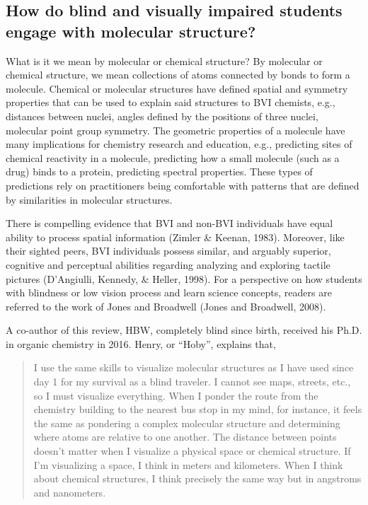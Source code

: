 \documentclass[11.5pt]{sig-alternate} %
\begin{document}
\begin{large}
\subsection*{How do blind and visually impaired students engage with molecular structure?}

What is it we mean by molecular or chemical structure? By molecular or chemical structure, we mean collections of atoms connected by bonds to form a molecule. Chemical or molecular structures have defined spatial and symmetry properties that can be used to explain said structures to BVI chemists, e.g., distances between nuclei, angles defined by the positions of three nuclei, molecular point group symmetry. The geometric properties of a molecule have many implications for chemistry research and education, e.g., predicting sites of chemical reactivity in a molecule, predicting how a small molecule (such as a drug) binds to a protein, predicting spectral properties. These types of predictions rely on practitioners being comfortable with patterns that are defined by similarities in molecular structures.

There is compelling evidence that BVI and non-BVI individuals have equal ability to process spatial information (Zimler \& Keenan, 1983). Moreover, like their sighted peers, BVI individuals possess similar, and arguably superior, cognitive and perceptual abilities regarding analyzing and exploring tactile pictures (D’Angiulli, Kennedy, \& Heller, 1998). For a perspective on how students with blindness or low vision process and learn science concepts, readers are referred to the work of Jones and Broadwell (Jones and Broadwell, 2008).

A co-author of this review, HBW, completely blind since birth, received his Ph.D. in organic chemistry in 2016. Henry, or “Hoby”, explains that,

\begin{quote}
    I use the same skills to visualize molecular structures as I have used since day 1 for my survival as a blind traveler. I cannot see maps, streets, etc., so I must visualize everything. When I ponder the route from the chemistry building to the nearest bus stop in my mind, for instance, it feels the same as pondering a complex molecular structure and determining where atoms are relative to one another. The distance between points doesn’t matter when I visualize a physical space or chemical structure. If I’m visualizing a space, I think in meters and kilometers. When I think about chemical structures, I think precisely the same way but in angstroms and nanometers. 
\end{quote}


\end{large}
\end{document}
